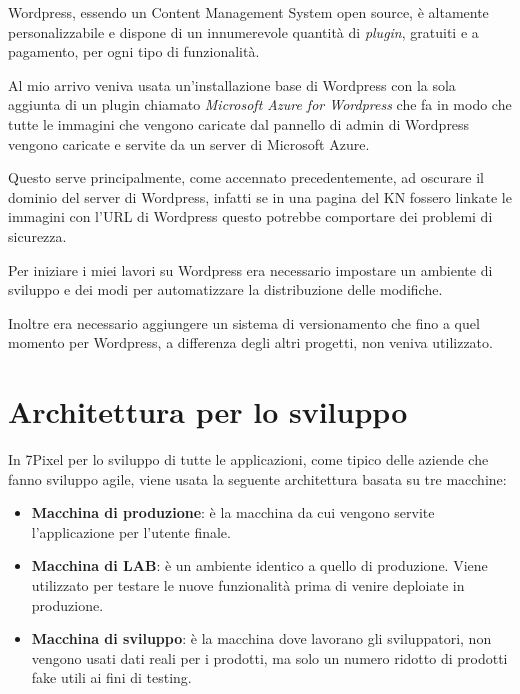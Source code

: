 


Wordpress, essendo un Content Management System open source, è altamente personalizzabile e dispone
di un innumerevole quantità di \emph{plugin}, gratuiti e a pagamento, per ogni tipo di funzionalità.

Al mio arrivo veniva usata un'installazione base di Wordpress con la sola aggiunta di un plugin chiamato \emph{Microsoft Azure 
for Wordpress} che fa in modo che tutte le immagini che vengono caricate dal pannello di admin di Wordpress
vengono caricate e servite da un server di Microsoft Azure.

Questo serve principalmente, come accennato precedentemente, ad oscurare il dominio del server di Wordpress,
infatti se in una pagina del KN fossero linkate le immagini con l'URL di Wordpress questo potrebbe 
comportare dei problemi di sicurezza.

Per iniziare i miei lavori su Wordpress era necessario impostare un ambiente di sviluppo e dei modi per automatizzare
la distribuzione delle modifiche.

Inoltre era necessario aggiungere un sistema di versionamento che fino a quel momento per Wordpress, a differenza
degli altri progetti, non veniva utilizzato.

\section{Architettura per lo sviluppo}

In 7Pixel per lo sviluppo di tutte le applicazioni, come tipico delle aziende che fanno sviluppo agile, viene usata la seguente architettura basata su tre macchine:
\begin{itemize}
\item {\bf Macchina di produzione}: è la macchina da cui vengono servite l'applicazione per l'utente finale.
\item {\bf Macchina di LAB}: è un ambiente identico a quello di produzione. Viene utilizzato per testare le nuove funzionalità
prima di venire deploiate in produzione.
\item {\bf Macchina di sviluppo}: è la macchina dove lavorano gli sviluppatori, non vengono usati dati reali per i prodotti, 
ma solo un numero ridotto di prodotti fake utili ai fini di testing.
\end{itemize}

